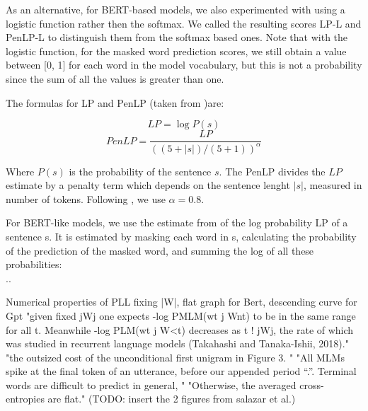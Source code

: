 As an alternative, for BERT-based models, we also experimented with using a logistic function rather then the softmax. We called the resulting scores LP-L and PenLP-L to distinguish them from the softmax based ones. Note that with the logistic function, for the masked word prediction scores, we still obtain a value between [0, 1] for each word in the model vocabulary, but this is not a probability since the sum of all the values is greater than one.

The formulas for LP and PenLP (taken from \citep{lau2020furiously})are:

\begin{displaymath}
	LP = \log P(s)
\end{displaymath}
\begin{displaymath}
	PenLP = \frac{LP}{((5+|s|) \big/ (5+1))^\alpha}
\end{displaymath}

Where \( P(s) \) is the probability of the sentence \( s \). The PenLP divides the \( LP \) estimate by a penalty term which depends on the sentence lenght \( |s| \), measured in number of tokens. Following \citet{lau2020furiously}, we use \( \alpha=0.8 \).

For BERT-like models, we use the estimate from \citet{lau2020furiously} of the log probability LP of a sentence s. It is estimated by masking each word in s, calculating the probability of the prediction of the masked word, and summing the log of all these probabilities:
\\ ..

Numerical properties of PLL
fixing |W|, flat graph for Bert, descending curve for Gpt  
"given fixed jWj one expects -log PMLM(wt j Wnt) to be in the same range for
all t. Meanwhile -log PLM(wt j W<t) decreases as t ! jWj, the rate of which was studied in recurrent language models (Takahashi and Tanaka-Ishii, 2018)." \citet{salazar2020masked}
"the outsized cost of the unconditional first unigram in Figure 3. "
"All MLMs spike at the final token of an utterance, before our appended period “.”. Terminal words are difficult to predict in general, " "Otherwise, the averaged cross-entropies are flat." \citet{salazar2020masked}
(TODO: insert the 2 figures from salazar et al.)

